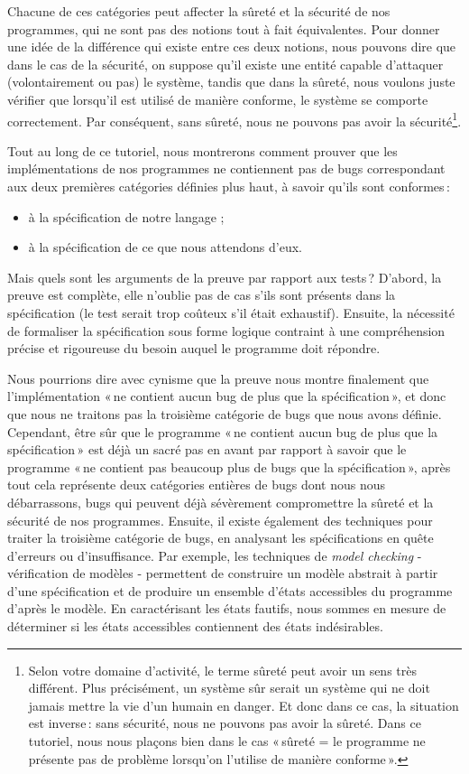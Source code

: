 Chacune de ces catégories peut affecter la sûreté et la sécurité de nos
programmes, qui ne sont pas des notions tout à fait équivalentes. Pour donner
une idée de la différence qui existe entre ces deux notions, nous pouvons
dire que dans le cas de la sécurité, on suppose qu’il existe une entité
capable d’attaquer (volontairement ou pas) le système, tandis que dans la
sûreté, nous voulons juste vérifier que lorsqu’il est utilisé de manière
conforme, le système se comporte correctement. Par conséquent, sans sûreté,
nous ne pouvons pas avoir la sécurité\footnote{Selon votre domaine
d’activité, le terme sûreté peut avoir un sens très différent. Plus
précisément, un système sûr serait un système qui ne doit jamais mettre la
vie d’un humain en danger. Et donc dans ce cas, la situation est inverse :
sans sécurité, nous ne pouvons pas avoir la sûreté. Dans ce tutoriel, nous
nous plaçons bien dans le cas « sûreté = le programme ne présente pas de
problème lorsqu’on l’utilise de manière conforme ».}.


Tout au long de ce tutoriel, nous montrerons comment prouver que les
implémentations de nos programmes ne contiennent pas de bugs correspondant
aux deux premières catégories définies plus haut, à savoir qu’ils sont
conformes :
\begin{itemize}
\item à la spécification de notre langage ;
\item à la spécification de ce que nous attendons d’eux.
\end{itemize}


Mais quels sont les arguments de la preuve par rapport aux tests ? D’abord,
la preuve est complète, elle n’oublie pas de cas s’ils sont présents dans la
spécification (le test serait trop coûteux s’il était exhaustif). Ensuite, la
nécessité de formaliser la spécification sous forme logique contraint à une
compréhension précise et rigoureuse du besoin auquel le programme doit répondre.


Nous pourrions dire avec cynisme que la preuve nous montre finalement que
l’implémentation « ne contient aucun bug de plus que la spécification », et
donc que nous ne traitons pas la troisième catégorie de bugs que nous avons
définie. Cependant, être sûr que le programme « ne contient aucun bug de
plus que la spécification » est déjà un sacré pas en avant par rapport à
savoir que le programme « ne contient pas beaucoup plus de bugs que la
spécification », après tout cela représente deux catégories entières de bugs
dont nous nous débarrassons, bugs qui peuvent déjà sévèrement compromettre la
sûreté et la sécurité de nos programmes. Ensuite, il existe également des
techniques pour traiter la troisième catégorie de bugs, en analysant les
spécifications en quête d’erreurs ou d’insuffisance. Par exemple, les
techniques de \textit{model checking} - vérification de modèles - permettent de
construire un modèle abstrait à partir d’une spécification et de produire
un ensemble d’états accessibles du programme d’après le modèle. En
caractérisant les états fautifs, nous sommes en mesure de déterminer si les
états accessibles contiennent des états indésirables.


